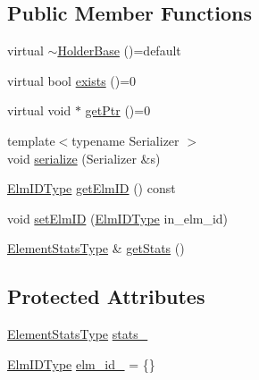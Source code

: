 \subsection*{Public Member Functions}
\begin{DoxyCompactItemize}
\item 
virtual \hyperlink{structvt_1_1objgroup_1_1holder_1_1_holder_base_a9388d2780a5ffa01677c3c535d42fbfa}{$\sim$\+Holder\+Base} ()=default
\item 
virtual bool \hyperlink{structvt_1_1objgroup_1_1holder_1_1_holder_base_afeebbe358baf0b2bfea57f52807be564}{exists} ()=0
\item 
virtual void $\ast$ \hyperlink{structvt_1_1objgroup_1_1holder_1_1_holder_base_a0b40d32b476b94586468abb5ae9a53a6}{get\+Ptr} ()=0
\item 
{\footnotesize template$<$typename Serializer $>$ }\\void \hyperlink{structvt_1_1objgroup_1_1holder_1_1_holder_base_a0d01f16a16316fab236b8753e7530efb}{serialize} (Serializer \&s)
\item 
\hyperlink{structvt_1_1objgroup_1_1holder_1_1_holder_base_a89c0ce1f23237ab00aee86d4d339bc50}{Elm\+I\+D\+Type} \hyperlink{structvt_1_1objgroup_1_1holder_1_1_holder_base_a36206831fe26ea16bd7bd3079bc45a8d}{get\+Elm\+ID} () const
\item 
void \hyperlink{structvt_1_1objgroup_1_1holder_1_1_holder_base_ac7bcdff4841dc78d23e7d96f7a383415}{set\+Elm\+ID} (\hyperlink{structvt_1_1objgroup_1_1holder_1_1_holder_base_a89c0ce1f23237ab00aee86d4d339bc50}{Elm\+I\+D\+Type} in\+\_\+elm\+\_\+id)
\item 
\hyperlink{structvt_1_1objgroup_1_1holder_1_1_holder_base_a2c1e7b13a85838aa6f4385266a20e7d5}{Element\+Stats\+Type} \& \hyperlink{structvt_1_1objgroup_1_1holder_1_1_holder_base_ae8b3ce89d3506e442fbf674ee9aa8230}{get\+Stats} ()
\end{DoxyCompactItemize}
\subsection*{Protected Attributes}
\begin{DoxyCompactItemize}
\item 
\hyperlink{structvt_1_1objgroup_1_1holder_1_1_holder_base_a2c1e7b13a85838aa6f4385266a20e7d5}{Element\+Stats\+Type} \hyperlink{structvt_1_1objgroup_1_1holder_1_1_holder_base_a83270e1974b919786da89599cab2a601}{stats\+\_\+}
\item 
\hyperlink{structvt_1_1objgroup_1_1holder_1_1_holder_base_a89c0ce1f23237ab00aee86d4d339bc50}{Elm\+I\+D\+Type} \hyperlink{structvt_1_1objgroup_1_1holder_1_1_holder_base_a0302cbe111e4bfa8cc8cd1fc47b39b27}{elm\+\_\+id\+\_\+} = \{\}
\end{DoxyCompactItemize}


